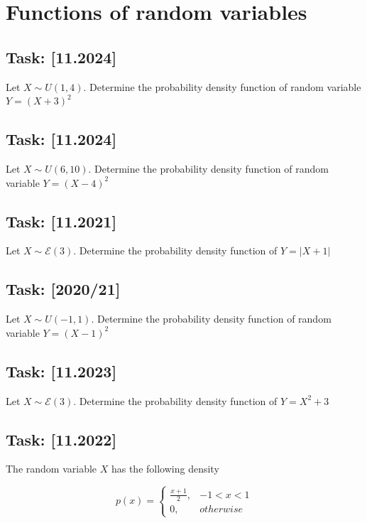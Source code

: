 \documentclass[a4paper, 12pt]{article}
\begin{document}
\section*{Functions of random variables}

\subsection*{Task: [11.2024]}

Let $X \sim U(1,4)$. Determine the probability density function of random variable $Y=(X+3)^2$



\subsection*{Task: [11.2024]}

Let $X \sim U(6,10)$. Determine the probability density function of random variable $Y=(X-4)^2$

\subsection*{Task: [11.2021]}

Let $X \sim \mathcal{E}(3)$. Determine the probability density function of $Y=|X+1|$ 

\subsection*{Task: [2020/21]}

Let $X \sim U(-1,1)$. Determine the probability density function of random variable $Y=(X-1)^2$

\subsection*{Task: [11.2023]}

Let $X \sim \mathcal{E}(3)$. Determine the probability density function of $Y=X^2+3$ 

\subsection*{Task: [11.2022]}

The random variable $X$ has the following density

\[
p(x) =
\begin{cases}
\frac{x+1}{2}, & -1 < x < 1\\
0, & otherwise
\end{cases}
\]
\end{document}
